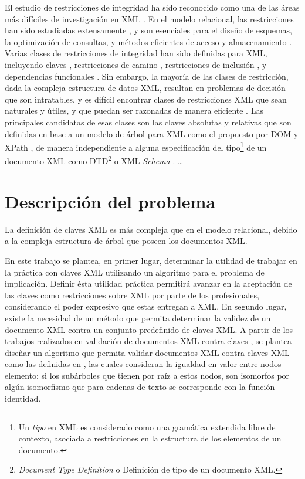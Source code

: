 El estudio de restricciones de integridad ha sido reconocido como una de las áreas más difíciles de investigación en XML \citep{Vianu:2003}. En el modelo relacional, las restricciones han sido estudiadas extensamente \citep{Fagin:1984, Thalheim:1991}, y son esenciales para el diseño de esquemas, la optimización de consultas, y métodos eficientes de acceso y almacenamiento \citep{Abiteboul:1995}. Varias clases de restricciones de integridad han sido definidas para XML, incluyendo claves \citep{Buneman:2002}, restricciones de camino \citep{Buneman:2001,Buneman:2000}, restricciones de inclusión \citep{Fan:2002,Fan:2003}, y dependencias funcionales \citep{Arenas:2004,Hartmann:2006,Vincent:2004}. Sin embargo, la mayoría de las clases de restricción, dada la compleja estructura de datos XML, resultan en problemas de decisión que son intratables, y es difícil encontrar clases de restricciones XML que sean naturales y útiles, y que puedan ser razonadas de manera eficiente \citep{Fan:2005,Fan:2003,Fan:2002,Suciu:2001,
Vianu:2003,Arenas:2002}. Las principales candidatas de esas clases son las claves absolutas y relativas \citep{Buneman:2003,Buneman:2002} que son definidas en base a un modelo de árbol para XML como el propuesto por DOM \citep{DOM:1998} y XPath \citep{XPath:1999}, de manera independiente a alguna especificación del tipo\footnote{Un \textit{tipo} en XML es considerado como una gramática extendida libre de contexto, asociada a restricciones en la estructura de los elementos de un documento.} de un documento XML como DTD\footnote{\textit{Document Type Definition} o Definición de tipo de un documento XML.} o XML \textit{Schema} \citep{XMLSchema:2004}. \ldots 


\section{Descripci\'on del problema}
\label{intro:problema}

La definición de claves XML es más compleja que en el modelo relacional, debido a la compleja estructura de árbol que poseen los documentos XML.

En este trabajo se plantea, en primer lugar, determinar la utilidad de trabajar en la práctica con claves XML utilizando un algoritmo para el problema de implicación. Definir ésta utilidad práctica permitirá avanzar en la aceptación de las claves como restricciones sobre XML por parte de los profesionales, considerando el poder expresivo que estas entregan a XML. En segundo lugar, existe la necesidad de un método que permita  determinar la validez de un documento XML contra un conjunto predefinido de claves XML. A partir de los trabajos realizados en validación de documentos XML contra claves \citep{Abrao:2004, Bouchou:2003, Chen:2002, Liu:2005, Liu:2004}, se plantea diseñar un algoritmo que permita validar documentos XML contra claves XML como las definidas en \citet{Buneman:2003,Buneman:2002}, las cuales consideran la igualdad en valor entre nodos elemento: si los subárboles que tienen por raíz a estos nodos, son isomorfos por algún isomorfismo que para cadenas de texto se corresponde con la función 
identidad.

